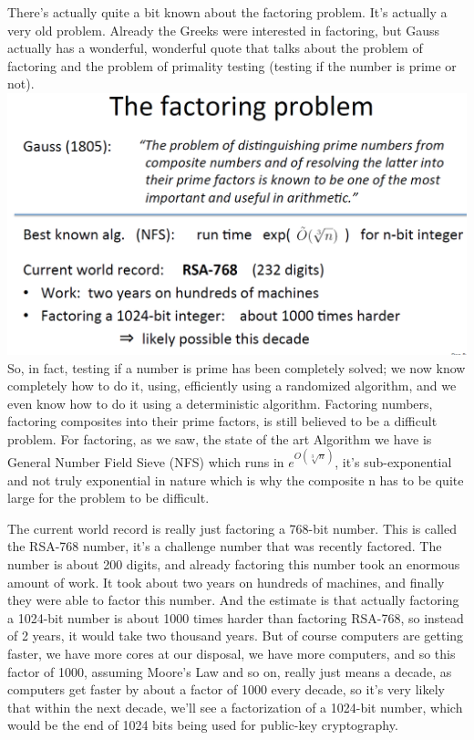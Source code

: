 \documentclass[11pt]{article}
\makeatletter
\def\maxwidth{\ifdim\Gin@nat@width>\linewidth\linewidth
    \else\Gin@nat@width\fi}
\let\Oldincludegraphics\includegraphics
\renewcommand{\includegraphics}[1]{\Oldincludegraphics[width=.8\maxwidth]{#1}}
\makeatother
\begin{document}
There's actually quite a bit known about the factoring problem. It's
actually a very old problem. Already the Greeks were interested in
factoring, but Gauss actually has a wonderful, wonderful quote that
talks about the problem of factoring and the problem of primality
testing (testing if the number is prime or not).
\includegraphics{./Images/NT-FactoringProb.png} So, in fact, testing if
a number is prime has been completely solved; we now know completely how
to do it, using, efficiently using a randomized algorithm, and we even
know how to do it using a deterministic algorithm. Factoring numbers,
factoring composites into their prime factors, is still believed to be a
difficult problem. For factoring, as we saw, the state of the art
Algorithm we have is General Number Field Sieve (NFS) which runs in
\(e^{O(\sqrt[3]{n})}\), it's sub-exponential and not truly exponential
in nature which is why the composite n has to be quite large for the
problem to be difficult.

The current world record is really just factoring a 768-bit number. This
is called the RSA-768 number, it's a challenge number that was recently
factored. The number is about 200 digits, and already factoring this
number took an enormous amount of work. It took about two years on
hundreds of machines, and finally they were able to factor this number.
And the estimate is that actually factoring a 1024-bit number is about
1000 times harder than factoring RSA-768, so instead of 2 years, it
would take two thousand years. But of course computers are getting
faster, we have more cores at our disposal, we have more computers, and
so this factor of 1000, assuming Moore's Law and so on, really just
means a decade, as computers get faster by about a factor of 1000 every
decade, so it's very likely that within the next decade, we'll see a
factorization of a 1024-bit number, which would be the end of 1024 bits
being used for public-key cryptography.
\end{document}
